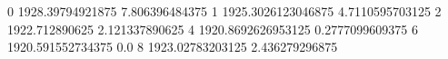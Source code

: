 0 1928.39794921875 7.806396484375
1 1925.3026123046875 4.7110595703125
2 1922.712890625 2.121337890625
4 1920.8692626953125 0.2777099609375
6 1920.591552734375 0.0
8 1923.02783203125 2.436279296875
